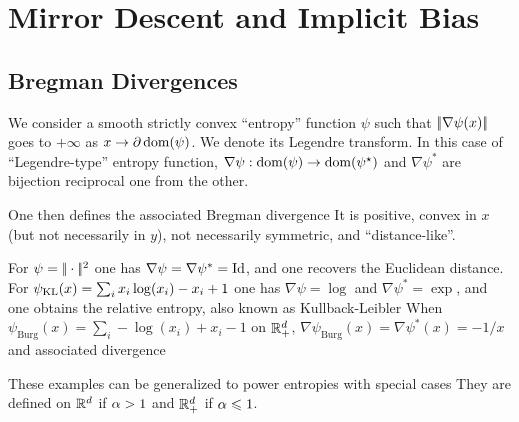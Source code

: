 
\section{Mirror Descent and Implicit Bias}


\subsection{Bregman Divergences}

We consider a smooth strictly convex ``entropy'' function $\psi$ such that $|\!| \nabla \psi(x) |\!|$ goes to $+\infty$ as $x \rightarrow \partial \operatorname{dom}(\psi)$.
%
We denote 
its Legendre transform.
%
In this case of ``Legendre-type'' entropy function, $\nabla\psi : \operatorname{dom}(\psi) \rightarrow \operatorname{dom}(\psi^\star)$ and $\nabla\psi^*$ are bijection reciprocal one from the other.

One then defines the associated Bregman divergence
It is positive, convex in $x$ (but not necessarily in $y$), not necessarily symmetric, and ``distance-like''.

For $\psi=|\!| \cdot |\!|^2$ one has $\nabla\psi=\nabla\psi^*=\mathrm{Id}$, and one recovers the Euclidean distance. 
%
For $\psi_{\operatorname{KL}}(x)=\sum_i x_i \log(x_i)-x_i+1$ one has $\nabla\psi=\log$ and $\nabla\psi^*=\exp$, and one obtains the relative entropy, also known as Kullback-Leibler 
%
When $\psi_{\text{Burg}}(x)=\sum_i -\log(x_i)+x_i-1$ on $\mathbb{R}_+^d$, $\nabla \psi_{\text{Burg}}(x)=\nabla\psi^*(x)=-1/x$ and associated divergence 


These examples can be generalized to power entropies
with special cases
They are defined on $\mathbb{R}^d$ if $\alpha>1$ and $\mathbb{R}_+^d$ if $\alpha \leqslant 1$. 

